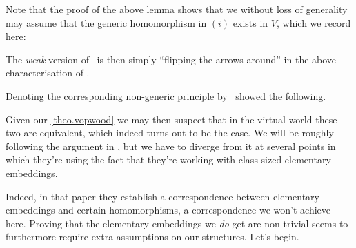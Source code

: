 \documentclass[../../main]{subfiles}
\begin{document}
  Note that the proof of the above lemma shows that we without loss of generality may assume that the generic homomorphism in $(i)$ exists in $V$, which we record here:


The \textit{weak} version of \gvp\ is then simply ``flipping the arrows around'' in the above characterisation of \gvp.


Denoting the corresponding non-generic principle by \wvp\, \cite{WilsonWVP} showed the following.


Given our \ref{theo.vopwood} we may then suspect that in the virtual world these two are equivalent, which indeed turns out to be the case. We will be roughly following the argument in \cite{WilsonWVP}, but we have to diverge from it at several points in which they're using the fact that they're working with class-sized elementary embeddings. 

\qquad Indeed, in that paper they establish a correspondence between elementary embeddings and certain homomorphisms, a correspondence we won't achieve here. Proving that the elementary embeddings we \textit{do} get are non-trivial seems to furthermore require extra assumptions on our structures. Let's begin.
\end{document}
